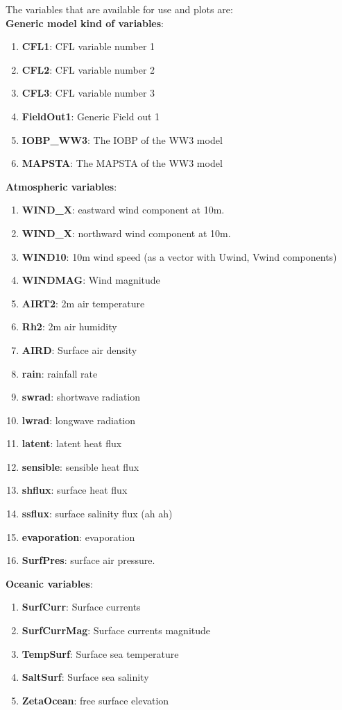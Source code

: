 \documentclass[12pt]{amsart}
\begin{document}
The variables that are available for use and plots are:\\
{\bf Generic model kind of variables}:
\begin{enumerate}
\item {\bf CFL1}: CFL variable number 1
\item {\bf CFL2}: CFL variable number 2
\item {\bf CFL3}: CFL variable number 3
\item {\bf FieldOut1}: Generic Field out 1
\item {\bf IOBP\_WW3}: The IOBP of the WW3 model
\item {\bf MAPSTA}: The MAPSTA of the WW3 model
\end{enumerate}
{\bf Atmospheric variables}:
\begin{enumerate}
\item {\bf WIND\_X}: eastward wind component at 10m.
\item {\bf WIND\_X}: northward wind component at 10m.
\item {\bf WIND10}: 10m wind speed (as a vector with Uwind, Vwind components)
\item {\bf WINDMAG}: Wind magnitude
\item {\bf AIRT2}: 2m air temperature
\item {\bf Rh2}: 2m air humidity
\item {\bf AIRD}: Surface air density
\item {\bf rain}: rainfall rate
\item {\bf swrad}: shortwave radiation
\item {\bf lwrad}: longwave radiation
\item {\bf latent}: latent heat flux
\item {\bf sensible}: sensible heat flux
\item {\bf shflux}: surface heat flux
\item {\bf ssflux}: surface salinity flux (ah ah)
\item {\bf evaporation}: evaporation
\item {\bf SurfPres}: surface air pressure.
\end{enumerate}
{\bf Oceanic variables}:
\begin{enumerate}
\item {\bf SurfCurr}: Surface currents
\item {\bf SurfCurrMag}: Surface currents magnitude
\item {\bf TempSurf}: Surface sea temperature
\item {\bf SaltSurf}: Surface sea salinity
\item {\bf ZetaOcean}: free surface elevation
\end{enumerate}
\end{document}
